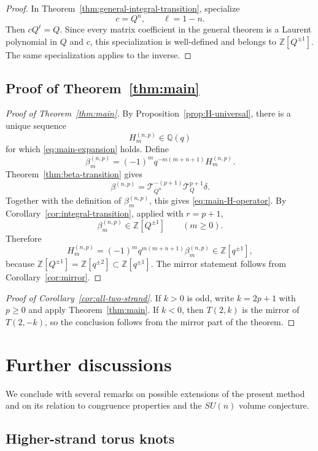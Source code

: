 \documentclass[11pt]{amsart}
\newcommand{\Z}{\mathbb Z}
\newcommand{\Q}{\mathbb Q}
\begin{document}
\begin{proof}
In Theorem~\ref{thm:general-integral-transition}, specialize
\[
c=Q^n,
\qquad
\ell=1-n.
\]
Then \(cQ^\ell=Q\).  Since every matrix coefficient in the general
theorem is a Laurent polynomial in \(Q\) and \(c\), this specialization
is well-defined and belongs to \(\Z[Q^{\pm1}]\).  The same
specialization applies to the inverse.
\end{proof}

\subsection{Proof of Theorem~\ref{thm:main}}

\begin{proof}[Proof of Theorem~\ref{thm:main}]
By Proposition~\ref{prop:H-universal}, there is a unique sequence
\[
H_m^{(n,p)}\in\Q(q)
\]
for which \eqref{eq:main-expansion} holds.  Define
\[
\beta_m^{(n,p)}
=
(-1)^m q^{-m(m+n+1)}H_m^{(n,p)}.
\]
Theorem~\ref{thm:beta-transition} gives
\[
\beta^{(n,p)}
=
\mathcal T_{Q^n}^{-(p+1)}
\mathcal T_Q^{p+1}\delta.
\]
Together with the definition of \(\beta_m^{(n,p)}\), this gives
\eqref{eq:main-H-operator}.
By Corollary~\ref{cor:integral-transition}, applied with \(r=p+1\),
\[
\beta_m^{(n,p)}\in\Z[Q^{\pm1}]
\qquad(m\geq0).
\]
Therefore
\[
H_m^{(n,p)}
=
(-1)^m q^{m(m+n+1)}\beta_m^{(n,p)}
\in\Z[q^{\pm1}],
\]
because \(\Z[Q^{\pm1}]=\Z[q^{\pm2}]\subset\Z[q^{\pm1}]\).
The mirror statement follows from Corollary~\ref{cor:mirror}.
\end{proof}

\begin{proof}[Proof of Corollary~\ref{cor:all-two-strand}]
If \(k>0\) is odd, write \(k=2p+1\) with \(p\geq0\) and apply
Theorem~\ref{thm:main}.  If \(k<0\), then \(T(2,k)\) is the mirror of
\(T(2,-k)\), so the conclusion follows from the mirror part of the
theorem. 
\end{proof}

\section{Further discussions}
\label{sec:related}

We conclude with several remarks on possible extensions of the present
method and on its relation to congruence properties and the
\(SU(n)\) volume conjecture.

\subsection{Higher-strand torus knots}
\end{document}
